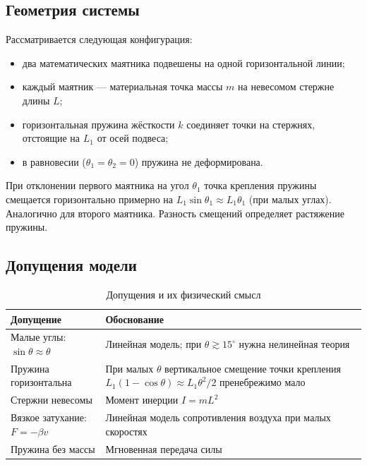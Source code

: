 \documentclass[12pt,a4paper]{article}
\begin{document}
\subsection{Геометрия системы}

Рассматривается следующая конфигурация:
\begin{itemize}
  \item два математических маятника подвешены на одной горизонтальной линии;
  \item каждый маятник --- материальная точка массы \(m\) на невесомом стержне
        длины \(L\);
  \item горизонтальная пружина жёсткости \(k\) соединяет точки на стержнях,
        отстоящие на \(L_1\) от осей подвеса;
  \item в равновесии (\(\theta_1=\theta_2=0\)) пружина не деформирована.
\end{itemize}

При отклонении первого маятника на угол \(\theta_1\) точка крепления пружины
смещается горизонтально примерно на \(L_1\sin\theta_1\approx L_1\theta_1\)
(при малых углах). Аналогично для второго маятника. Разность смещений определяет
растяжение пружины.

\subsection{Допущения модели}

\begin{table}[H]
\centering
\caption{Допущения и их физический смысл}
\begin{tabular}{@{}p{4.2cm}p{9.5cm}@{}}
\toprule
Допущение & Обоснование \\
\midrule
Малые углы: \(\sin\theta\approx\theta\) &
  Линейная модель; при \(\theta\gtrsim15^\circ\) нужна нелинейная теория \\[4pt]
Пружина горизонтальна &
  При малых \(\theta\) вертикальное смещение точки крепления
  \(L_1(1-\cos\theta)\approx L_1\theta^2/2\) пренебрежимо мало \\[4pt]
Стержни невесомы &
  Момент инерции \(I=mL^2\) \\[4pt]
Вязкое затухание: \(F=-\beta v\) &
  Линейная модель сопротивления воздуха при малых скоростях \\[4pt]
Пружина без массы &
  Мгновенная передача силы \\
\bottomrule
\end{tabular}
\end{table}
\end{document}
